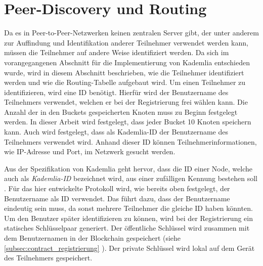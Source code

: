 \section{Peer-Discovery und Routing}
\label{subsec:identifikation_von_teilnehmern}

Da es in Peer-to-Peer-Netzwerken keinen zentralen Server gibt, der unter anderem zur Auffindung und Identifikation anderer Teilnehmer verwendet werden kann, müssen die Teilnehmer auf andere Weise identifiziert werden. Da sich im vorangegangenen Abschnitt für die Implementierung von Kademlia entschieden wurde, wird in diesem Abschnitt beschrieben, wie die Teilnehmer identifiziert werden und wie die Routing-Tabelle aufgebaut wird. Um einen Teilnehmer zu identifizieren, wird eine ID benötigt. Hierfür wird der Benutzername des Teilnehmers verwendet, welchen er bei der Registrierung frei wählen kann. Die Anzahl der in den Buckets gespeicherten Knoten muss zu Beginn festgelegt werden. In dieser Arbeit wird festgelegt, dass jeder Bucket 10 Knoten speichern kann. Auch wird festgelegt, dass als Kademlia-ID der Benutzername des Teilnehmers verwendet wird. Anhand dieser ID können Teilnehmerinformationen, wie IP-Adresse und Port, im Netzwerk gesucht werden.

Aus der Spezifikation von Kademlia geht hervor, dass die ID einer Node, welche auch als \textit{Kademlia-ID} bezeichnet wird, aus einer zufälligen Kennung bestehen soll \parencite[S. 2]{Maymounkov_Kademlia}. Für das hier entwickelte Protokoll wird, wie bereits oben festgelegt, der Benutzername als ID verwendet. Das führt dazu, dass der Benutzername eindeutig sein muss, da sonst mehrere Teilnehmer die gleiche ID haben könnten. Um den Benutzer später identifizieren zu können, wird bei der Registrierung ein statisches Schlüsselpaar generiert. Der öffentliche Schlüssel wird zusammen mit dem Benutzernamen in der Blockchain gespeichert (siehe \ref{subsec:contract_registrierung} \textit{}). Der private Schlüssel wird lokal auf dem Gerät des Teilnehmers gespeichert. 


